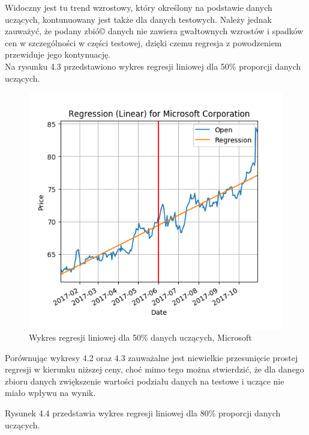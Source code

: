 Widoczny jest tu trend wzrostowy, który określony na podstawie danych uczących, kontunuowany jest także dla danych testowych.
Należy jednak zauważyć, że podany zbió© danych nie zawiera gwałtownych wzrostów i spadków cen w szczególności w części testowej, dzięki czemu regresja z powodzeniem przewiduje jego kontynuację.\\

Na rysunku 4.3 przedstawiono wykres regresji liniowej dla 50\% proporcji danych uczących.
\begin{figure}[h!]
\centering
\includegraphics[width=150mm]{pictures/plots/microsoft_linear_50.png}
\caption{Wykres regresji liniowej dla 50\% danych uczących, Microsoft}
\label{fig:Wykres regresji liniowej dla 50\% danych uczących, Microsoft}
\end{figure}

Porównując wykresy 4.2 oraz 4.3 zauważalne jest niewielkie przesunięcie prostej regresji w kierunku niższej ceny, 
choć mimo tego można stwierdzić, że dla danego zbioru danych zwiększenie wartości podziału danych na testowe i uczące nie miało wpływu na wynik.

Rysunek 4.4 przedstawia wykres regresji liniowej dla 80\% proporcji danych uczących.\\

